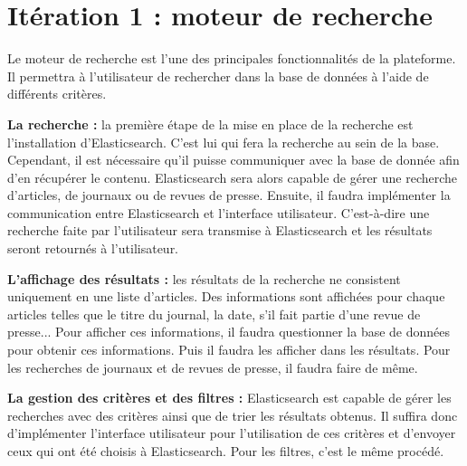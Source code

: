 \section{Itération 1 : moteur de recherche}

Le moteur de recherche est l'une des principales fonctionnalités de la plateforme. Il permettra à l'utilisateur de rechercher dans la base de données à l'aide de différents critères.

\textbf{La recherche :} la première étape de la mise en place de la recherche est l'installation d'Elasticsearch. C'est lui qui fera la recherche au sein de la base. Cependant, il est nécessaire qu'il puisse communiquer avec la base de donnée afin d'en récupérer le contenu. Elasticsearch sera alors capable de gérer une recherche d'articles, de journaux ou de revues de presse. Ensuite, il faudra implémenter la communication entre Elasticsearch et l'interface utilisateur. C'est-à-dire une recherche faite par l'utilisateur sera transmise à Elasticsearch et les résultats seront retournés à l'utilisateur. 

\textbf{L'affichage des résultats :} les résultats de la recherche ne consistent uniquement en une liste d'articles. Des informations sont affichées pour chaque articles telles que le titre du journal, la date, s'il fait partie d'une revue de presse... Pour afficher ces informations, il faudra questionner la base de données pour obtenir ces informations. Puis il faudra les afficher dans les résultats. Pour les recherches de journaux et de revues de presse, il faudra faire de même.

\textbf{La gestion des critères et des filtres :} Elasticsearch est capable de gérer les recherches avec des critères ainsi que de trier les résultats obtenus.  Il suffira donc d'implémenter l'interface utilisateur pour l'utilisation de ces critères et d'envoyer ceux qui ont été choisis à Elasticsearch. Pour les filtres, c'est le même procédé.  
